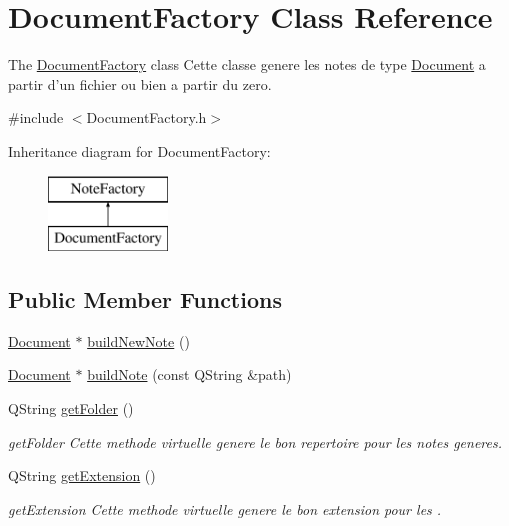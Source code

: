 \hypertarget{class_document_factory}{\section{Document\-Factory Class Reference}
\label{class_document_factory}
}


The \hyperlink{class_document_factory}{Document\-Factory} class Cette classe genere les notes de type \hyperlink{class_document}{Document} a partir d'un fichier ou bien a partir du zero.  




{\ttfamily \#include $<$Document\-Factory.\-h$>$}

Inheritance diagram for Document\-Factory\-:\begin{figure}[H]
\begin{center}
\leavevmode
\includegraphics[height=2.000000cm]{class_document_factory}
\end{center}
\end{figure}
\subsection*{Public Member Functions}
\begin{DoxyCompactItemize}
\item 
\hyperlink{class_document}{Document} $\ast$ \hyperlink{class_document_factory_ac6a6034e7559364395ab9d36d72b677e}{build\-New\-Note} ()
\item 
\hyperlink{class_document}{Document} $\ast$ \hyperlink{class_document_factory_acd8c457444bbf197f4b7fe33ca3161e2}{build\-Note} (const Q\-String \&path)
\item 
Q\-String \hyperlink{class_document_factory_a73e14a453374937267c4556fdd9e7508}{get\-Folder} ()
\begin{DoxyCompactList}\small\item\em get\-Folder Cette methode virtuelle genere le bon repertoire pour les notes generes. \end{DoxyCompactList}\item 
Q\-String \hyperlink{class_document_factory_a34912629970356c2c8737abeac2d30d4}{get\-Extension} ()
\begin{DoxyCompactList}\small\item\em get\-Extension Cette methode virtuelle genere le bon extension pour les . \end{DoxyCompactList}\end{DoxyCompactItemize}
